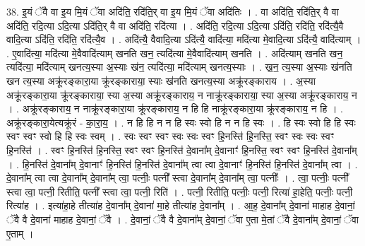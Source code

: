 \documentclass[17pt]{extarticle}
\begin{document}
38. इ॒यं ॅवै वा इ॒य मि॒यं ॅवा अदि॑ति॒ रदि॑ति॒र् वा इ॒य मि॒यं ॅवा अदि॑तिः । . वा अदि॑ति॒ रदि॑ति॒र् वै वा अदि॑ति॒ रदि॒त्या ऽदि॒त्या ऽदि॑ति॒र् वै वा अदि॑ति॒ रदि॑त्या । . अदि॑ति॒ रदि॒त्या ऽदि॒त्या ऽदि॑ति॒ रदि॑ति॒ रदि॑त्यै॒वै वादि॒त्या ऽदि॑ति॒ रदि॑ति॒ रदि॑त्यै॒व । . अदि॑त्यै॒ वैवादि॒त्या ऽदि॑त्यै॒ वादि॑त्या॒ मदि॑त्या मे॒वादि॒त्या ऽदि॑त्यै॒ वादि॑त्याम् । . ए॒वादि॑त्या॒ मदि॑त्या मे॒वैवादि॑त्याम् खनति खन॒ त्यदि॑त्या मे॒वैवादि॑त्याम् खनति । . अदि॑त्याम् खनति खन॒ त्यदि॑त्या॒ मदि॑त्याम् खनत्य॒स्या अ॒स्याः ख॑न॒ त्यदि॑त्या॒ मदि॑त्याम् खनत्य॒स्याः । . ख॒न॒ त्य॒स्या अ॒स्याः ख॑नति खन त्य॒स्या अक्रू॑रङ्कारा॒या क्रू॑रङ्काराया॒ स्याः ख॑नति खनत्य॒स्या अक्रू॑रङ्काराय । . अ॒स्या अक्रू॑रङ्कारा॒या क्रू॑रङ्काराया॒ स्या अ॒स्या अक्रू॑रङ्काराय॒ न नाक्रू॑रङ्काराया॒ स्या अ॒स्या अक्रू॑रङ्काराय॒ न । . अक्रू॑रङ्काराय॒ न नाक्रू॑रङ्कारा॒या क्रू॑रङ्काराय॒ न हि हि नाक्रू॑रङ्कारा॒या क्रू॑रङ्काराय॒ न हि । . अक्रू॑रङ्कारा॒येत्यक्रू॑रं - का॒रा॒य॒ । . न हि हि न न हि स्वः स्वो हि न न हि स्वः । . हि स्वः स्वो हि हि स्वः स्वꣳ स्वꣳ स्वो हि हि स्वः स्वम् । . स्वः स्वꣳ स्वꣳ स्वः स्वः स्वꣳ हि॒नस्ति॑ हि॒नस्ति॒ स्वꣳ स्वः स्वः स्वꣳ हि॒नस्ति॑ । . स्वꣳ हि॒नस्ति॑ हि॒नस्ति॒ स्वꣳ स्वꣳ हि॒नस्ति॑ दे॒वाना᳚म् दे॒वानाꣳ॑ हि॒नस्ति॒ स्वꣳ स्वꣳ हि॒नस्ति॑ दे॒वाना᳚म् । . हि॒नस्ति॑ दे॒वाना᳚म् दे॒वानाꣳ॑ हि॒नस्ति॑ हि॒नस्ति॑ दे॒वाना᳚म् त्वा त्वा दे॒वानाꣳ॑ हि॒नस्ति॑ हि॒नस्ति॑ दे॒वाना᳚म् त्वा । . दे॒वाना᳚म् त्वा त्वा दे॒वाना᳚म् दे॒वाना᳚म् त्वा॒ पत्नीः॒ पत्नी᳚ स्त्वा दे॒वाना᳚म् दे॒वाना᳚म् त्वा॒ पत्नीः᳚ । . त्वा॒ पत्नीः॒ पत्नी᳚ स्त्वा त्वा॒ पत्नी॒ रितीति॒ पत्नी᳚ स्त्वा त्वा॒ पत्नी॒ रिति॑ । . पत्नी॒ रितीति॒ पत्नीः॒ पत्नी॒ रित्या॑ हा॒हेति॒ पत्नीः॒ पत्नी॒ रित्या॑ह । . इत्या॑हा॒हे तीत्या॑ह दे॒वाना᳚म् दे॒वाना॑ मा॒हे तीत्या॑ह दे॒वाना᳚म् । . आ॒ह॒ दे॒वाना᳚म् दे॒वाना॑ माहाह दे॒वानां॒ ॅवै वै दे॒वाना॑ माहाह दे॒वानां॒ ॅवै । . दे॒वानां॒ ॅवै वै दे॒वाना᳚म् दे॒वानां॒ ॅवा ए॒ता मे॒तां ॅवै दे॒वाना᳚म् दे॒वानां॒ ॅवा ए॒ताम् । \newline
\pagebreak
{}
\end{document}
